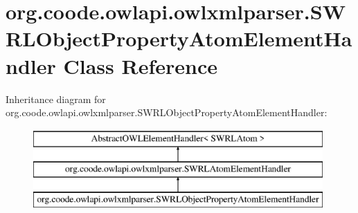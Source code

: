 \hypertarget{classorg_1_1coode_1_1owlapi_1_1owlxmlparser_1_1_s_w_r_l_object_property_atom_element_handler}{\section{org.\-coode.\-owlapi.\-owlxmlparser.\-S\-W\-R\-L\-Object\-Property\-Atom\-Element\-Handler Class Reference}
\label{classorg_1_1coode_1_1owlapi_1_1owlxmlparser_1_1_s_w_r_l_object_property_atom_element_handler}
}
Inheritance diagram for org.\-coode.\-owlapi.\-owlxmlparser.\-S\-W\-R\-L\-Object\-Property\-Atom\-Element\-Handler\-:\begin{figure}[H]
\begin{center}
\leavevmode
\includegraphics[height=3.000000cm]{classorg_1_1coode_1_1owlapi_1_1owlxmlparser_1_1_s_w_r_l_object_property_atom_element_handler}
\end{center}
\end{figure}
